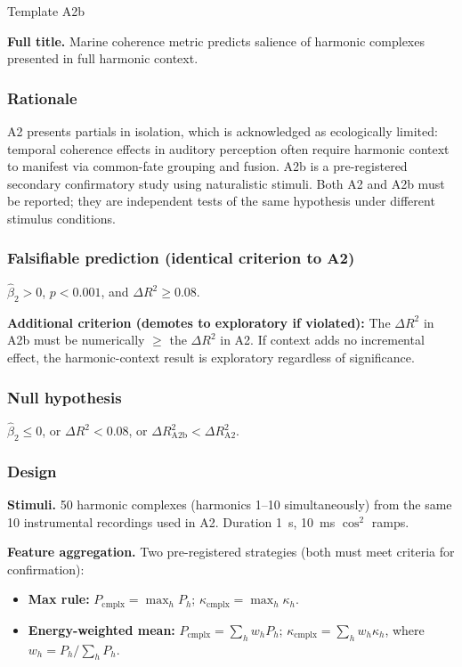 \documentclass[11pt, a4paper]{article}
\begin{document}
\begin{predbox}{Template A2b}

\textbf{Full title.}
Marine coherence metric predicts salience of harmonic complexes presented in
full harmonic context.

\subsubsection{Rationale}

A2 presents partials in isolation, which is acknowledged as ecologically
limited: temporal coherence effects in auditory perception often require
harmonic context to manifest via common-fate grouping and fusion.  A2b is a
pre-registered secondary confirmatory study using naturalistic stimuli.  Both
A2 and A2b must be reported; they are independent tests of the same hypothesis
under different stimulus conditions.

\subsubsection{Falsifiable prediction (identical criterion to A2)}

$\hat{\beta}_2 > 0$, $p < 0.001$, and $\Delta R^2 \geq 0.08$.

\textbf{Additional criterion (demotes to exploratory if violated):}
The $\Delta R^2$ in A2b must be numerically $\geq$ the $\Delta R^2$ in A2.
If context adds no incremental effect, the harmonic-context result is
exploratory regardless of significance.

\subsubsection{Null hypothesis}

$\hat{\beta}_2 \leq 0$, or $\Delta R^2 < 0.08$, or $\Delta R^2_\text{A2b} <
\Delta R^2_\text{A2}$.

\subsubsection{Design}

\textbf{Stimuli.}  50 harmonic complexes (harmonics 1–10 simultaneously) from
the same 10 instrumental recordings used in A2.  Duration 1~s, 10~ms $\cos^2$
ramps.

\textbf{Feature aggregation.}  Two pre-registered strategies (both must meet
criteria for confirmation):
\begin{itemize}
  \item \textbf{Max rule:} $P_\text{cmplx} = \max_h P_h$;
    $\kappa_\text{cmplx} = \max_h \kappa_h$.
  \item \textbf{Energy-weighted mean:} $P_\text{cmplx} = \sum_h w_h P_h$;
    $\kappa_\text{cmplx} = \sum_h w_h \kappa_h$, where
    $w_h = P_h / \sum_h P_h$.
\end{itemize}


\end{predbox}
\end{document}
